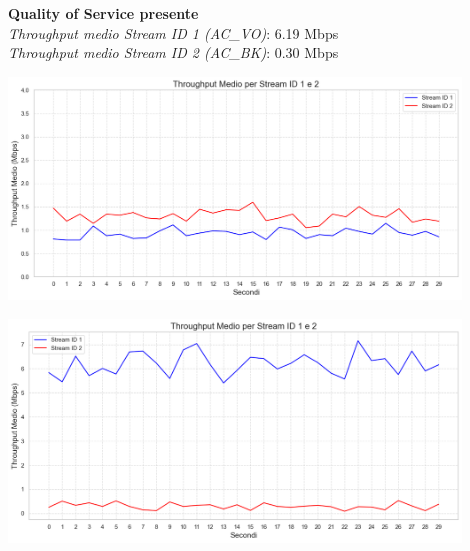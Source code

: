 \documentclass[aspectratio=169]{beamer}
\begin{document}
\begin{frame}
\begin{minipage}{0.9\textwidth}
\begin{minipage}{0.45\textwidth}
            \textbf{Quality of Service presente}\\
            \textit{Throughput medio Stream ID 1 (AC\_VO)}: 6.19 Mbps\\
            \textit{Throughput medio Stream ID 2 (AC\_BK)}: 0.30 Mbps\\
        \end{minipage}
        \hfill
        \begin{minipage}{0.5\textwidth}
            \centering
            \begin{minipage}{\textwidth}
                \includegraphics[width=0.9\textwidth]{t1_c2_main.png}
                \vspace{0.5cm}
            \end{minipage}
            \begin{minipage}{\textwidth}
                \includegraphics[width=0.9\textwidth]{t2_c2_main.png}
            \end{minipage}
        \end{minipage}
    \end{minipage}
\end{frame}
\end{document}
